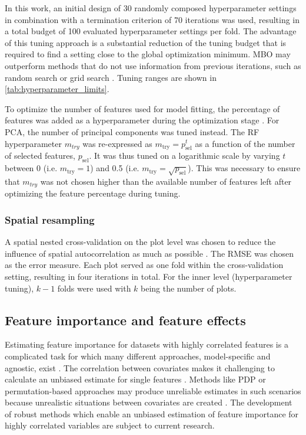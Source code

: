 \documentclass[final]{IEEEtran}
\begin{document}
In this work, an initial design of 30 randomly composed hyperparameter settings in combination with a termination criterion of 70 iterations was used, resulting in a total budget of 100 evaluated hyperparameter settings per fold.
The advantage of this tuning approach is a substantial reduction of the tuning budget that is required to find a setting close to the global optimization minimum.
\ac{MBO} may outperform methods that do not use information from previous iterations, such as random search or grid search \cite{bergstra2012}.
Tuning ranges are shown in \autoref{tab:hyperparameter_limits}.

To optimize the number of features used for model fitting, the percentage of features was added as a hyperparameter during the optimization stage \cite{binder2020}.
For \ac{PCA}, the number of principal components was tuned instead.
The RF hyperparameter \texttt{\(m_{try}\)} was re-expressed as $m_\textrm{try} = p_\textrm{sel}^t$ as a function of the number of selected features, $p_\textrm{sel}$.
It was thus tuned on a logarithmic scale by varying $t$ between 0 (i.e. $m_\textrm{try} = 1$) and 0.5 (i.e. $m_\textrm{try}=\sqrt{p_\textrm{sel}}$).
This was necessary to ensure that \texttt{\(m_{try}\)} was not chosen higher than the available number of features left after optimizing the feature percentage during tuning.

\subsubsection{Spatial resampling}

A spatial nested cross-validation on the plot level was chosen to reduce the influence of spatial autocorrelation as much as possible \cite{schratz2019, sperrorest}.
The \ac{RMSE} was chosen as the error measure.
Each plot served as one fold within the cross-validation setting, resulting in four iterations in total.
For the inner level (hyperparameter tuning), \(k - 1\) folds were used with \(k\) being the number of plots.

\subsection{Feature importance and feature effects}

Estimating feature importance for datasets with highly correlated features is a complicated task for which many different approaches, model-specific and agnostic, exist \cite{friedman2001, hastie2001, greenwell2018}.
The correlation between covariates makes it challenging to calculate an unbiased estimate for single features \cite{molnar2019}.
Methods like \ac{PDP} or permutation-based approaches may produce unreliable estimates in such scenarios because unrealistic situations between covariates are created \cite{molnar2019}.
The development of robust methods which enable an unbiased estimation of feature importance for highly correlated variables are subject to current research.
\end{document}
